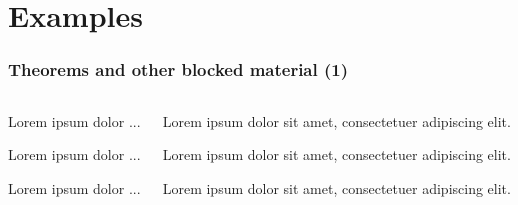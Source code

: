 \documentclass[aspectratio=1610]{beamer}
\begin{document}
\section{Examples}

\begin{frame}[fragile]
  \frametitle{Theorems and other blocked material (1)}
  \begin{columns}[onlytextwidth]
    \begin{column}{0.45\textwidth}
\begin{CodeBox}{}
\begin{definition}[def]
  Lorem ipsum dolor ...
\end{definition}
\end{CodeBox}

\begin{CodeBox}{}
\begin{theorem}[theorem]
  Lorem ipsum dolor ...
\end{theorem}
\end{CodeBox}

\begin{CodeBox}{}
\begin{example}[example]
  Lorem ipsum dolor ...
\end{example}
\end{CodeBox}
    \end{column}\textwidth%
    \begin{column}{0.5\textwidth}
  \begin{definition}[def]
    Lorem ipsum dolor sit amet, consectetuer adipiscing elit. 
  \end{definition}
  \begin{theorem}[theorem]
    Lorem ipsum dolor sit amet, consectetuer adipiscing elit. 
  \end{theorem}
  \begin{example}[example]
    Lorem ipsum dolor sit amet, consectetuer adipiscing elit. 
  \end{example}
    \end{column}
  \end{columns}
\end{frame}
\end{document}
